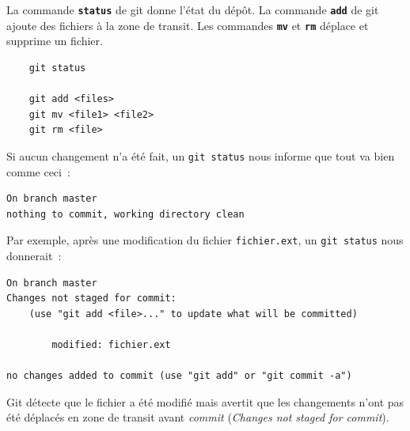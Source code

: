 \documentclass[a4paper,11pt]{style-esi/td}
\begin{document}
La commande \texttt{\textbf{status}} de git donne l'état du dépôt.
La commande \texttt{\textbf{add}} de git ajoute des fichiers à la zone de transit. Les commandes \texttt{\textbf{mv}} et \texttt{\textbf{rm}} déplace et supprime un fichier. 

\bigskip
\begin{colxbox}[colback=white,drop fuzzy shadow]
	\begin{verbatim}
	git status

	git add <files>
	git mv <file1> <file2>
	git rm <file>
	\end{verbatim}
\end{colxbox}
\bigskip

Si aucun changement n'a été fait, un \texttt{git status} nous informe que tout va
bien comme ceci :

\begin{verbatim}
On branch master 
nothing to commit, working directory clean 
\end{verbatim}

Par exemple, après une modification du fichier \texttt{fichier.ext}, un
\texttt{git status} nous donnerait : 

\begin{verbatim}
On branch master 
Changes not staged for commit: 
    (use "git add <file>..." to update what will be committed) 

		modified: fichier.ext 

no changes added to commit (use "git add" or "git commit -a") 
\end{verbatim}

Git détecte que le fichier a été modifié mais avertit que les changements n’ont
pas été déplacés en zone de transit avant \textit{commit} (\textit{Changes not staged for
commit}). 
\end{document}
